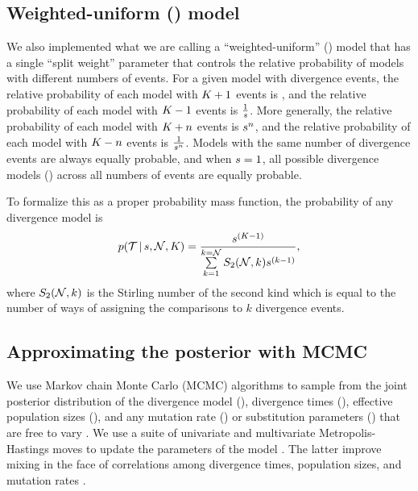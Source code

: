 \documentclass[letterpaper,12pt]{article}
\begin{document}
\subsection{Weighted-uniform (\wunif) model}
We also implemented what we are calling a ``weighted-uniform'' (\wunif) model
that has a single ``split weight'' parameter that controls the relative
probability of models with different numbers of events.
For a given model with \nevents divergence events, the relative probability
of each model with $K_{} + 1$ events is \splitweight,
and the relative probability of each model with $K_{} - 1$ events is
$\frac{1}{s}$.
More generally, the relative probability of each model with
$K_{} + n$
events is
$s{}^n$,
and the relative probability of each model with
$K_{} - n$
events is
$\frac{1}{s{}^n}$.
Models with the same number of divergence events
are always equally probable,
and
when $s = 1$, all possible divergence models (\etimesets) across all
numbers of events are equally probable.

\begin{linenomath}
To formalize this as a proper probability mass function,
the probability of any divergence model is
\begin{equation}
    p(\mathcal{T} \,|\, s, \mathcal{N}, K_{}) = 
    \frac{
        s^{(K_{} - 1)}
    }{
        \sum\limits_{k=1}^{k=\mathcal{N}} S_2(\mathcal{N}, k) s^{(k-1)}
    },
    \label{eq:uniformdivmodelprob}
\end{equation}
where $S_2(\mathcal{N}, k)$ is the Stirling number of the second kind which
is equal to the number of ways of assigning the \ncomparisons comparisons to
$k$ divergence events.
\end{linenomath}

\subsection{Approximating the posterior with MCMC}

We use Markov chain Monte Carlo (MCMC) algorithms to sample from the joint
posterior distribution of the divergence model (\etimesets), divergence times
(\etimes), effective population sizes (\epopsize), and any mutation rate
(\murate) or substitution parameters (\gfreq) that are free to vary
\citep{Oaks2018ecoevolity,Oaks2019codemog}.
We use a suite of univariate and multivariate Metropolis-Hastings moves to
update the parameters of the model \citep{Metropolis1953,Hastings1970}.
The latter improve mixing in the face of correlations among divergence times,
population sizes, and mutation rates \citep[see][]{Oaks2018ecoevolity}.
\end{document}
